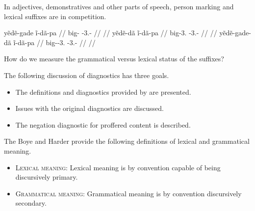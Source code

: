 \documentclass{beamer}
\begin{document}


\begin{frame}{In adjectives, demonstratives and other parts of speech, person marking and lexical suffixes are in competition.}

  \pex
  \a\begingl
  \gla yẽdẽ-gade ĩ-dã-pa //
  \glb big- -3.- //
  \glft {}//
  \endgl
  \a\begingl
  \gla yẽdẽ-dã ĩ-dã-pa //
  \glb big-3. -3.- //
  \glft {}//
  \endgl
  \a\ljudge{*}\begingl
  \gla yẽdẽ-gade-dã ĩ-dã-pa //
  \glb big--3. -3.- //
  \glft {}//
  \endgl
  \xe
  
\end{frame}

\begin{frame}{How do we measure the grammatical versus lexical status of the suffixes?}

  The following discussion of diagnostics has three goals.
  
  \begin{itemize}
  \item The definitions and diagnostics provided by \citet{Boye2012} are presented.
  \item Issues with the original diagnostics are discussed.
  \item The negation diagnostic for proffered content is described.
  \end{itemize}
\end{frame}

\begin{frame}{The Boye and Harder provide the following definitions of lexical and grammatical meaning.}
  \begin{itemize}
  \item {\scshape Lexical meaning}: Lexical meaning is by convention capable of being discursively primary.
  \item {\scshape Grammatical meaning}: Grammatical meaning is by convention discursively secondary.
  \end{itemize}
\end{frame}
\end{document}
